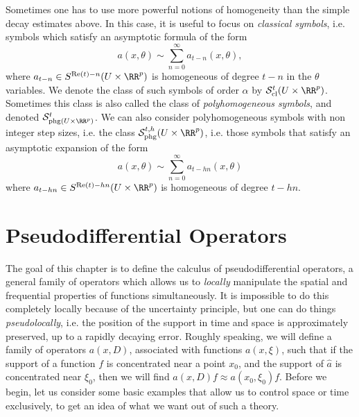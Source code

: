 Sometimes one has to use more powerful notions of homogeneity than the simple decay estimates above. In this case, it is useful to focus on \emph{classical symbols}, i.e. symbols which satisfy an asymptotic formula of the form
%
\[ a(x,\theta) \sim \sum_{n = 0}^\infty a_{t-n}(x,\theta), \]
%
where $a_{t-n} \in S^{\text{Re}(t) - n}(U \times \RR^p)$ is homogeneous of degree $t-n$ in the $\theta$ variables. We denote the class of such symbols of order $\alpha$ by $\mathcal{S}^t_{\text{cl}}(U \times \RR^p)$. Sometimes this class is also called the class of \emph{polyhomogeneous symbols}, and denoted $\mathcal{S}^t_{\text{phg}(U \times \RR^p)}$. We can also consider polyhomogeneous symbols with non integer step sizes, i.e. the class $\mathcal{S}^{t,h}_{\text{phg}}(U \times \RR^p)$, i.e. those symbols that satisfy an asymptotic expansion of the form
%
\[ a(x,\theta) \sim \sum_{n = 0}^\infty a_{t - hn}(x,\theta) \]
%
where $a_{t-hn} \in S^{\text{Re}(t) - hn}(U \times \RR^p)$ is homogeneous of degree $t-hn$.












\chapter{Pseudodifferential Operators}

The goal of this chapter is to define the calculus of pseudodifferential operators, a general family of operators which allows us to \emph{locally} manipulate the spatial and frequential properties of functions simultaneously. It is impossible to do this completely locally because of the uncertainty principle, but one can do things \emph{pseudolocally}, i.e. the position of the support in time and space is approximately preserved, up to a rapidly decaying error. Roughly speaking, we will define a family of operators $a(x,D)$, associated with functions $a(x,\xi)$, such that if the support of a function $f$ is concentrated near a point $x_0$, and the support of $\widehat{a}$ is concentrated near $\xi_0$, then we will find $a(x,D) f \approx a(x_0,\xi_0) f$. Before we begin, let us consider some basic examples that allow us to control space or time exclusively, to get an idea of what we want out of such a theory.


